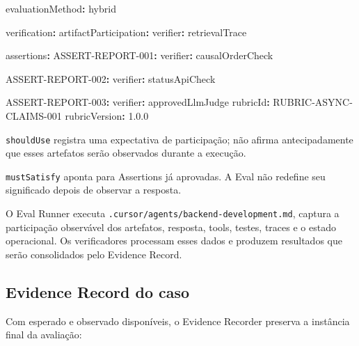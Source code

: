 \documentclass[
  10pt,
  a4paper,
  oneside]{book}
\newenvironment{Shaded}{}{}
\newcommand{\AttributeTok}[1]{\textcolor[rgb]{0.49,0.56,0.16}{#1}}
\newcommand{\FloatTok}[1]{\textcolor[rgb]{0.25,0.63,0.44}{#1}}
\newcommand{\FunctionTok}[1]{\textcolor[rgb]{0.02,0.16,0.49}{#1}}
\newcommand{\KeywordTok}[1]{\textcolor[rgb]{0.00,0.44,0.13}{\textbf{#1}}}
\renewenvironment{Shaded}{\begin{snugshade}}{\end{snugshade}}%
\begin{document}
\begin{Shaded}
\begin{Highlighting}[]
\FunctionTok{evaluationMethod}\KeywordTok{:}\AttributeTok{ hybrid}

\FunctionTok{verification}\KeywordTok{:}
\AttributeTok{  }\FunctionTok{artifactParticipation}\KeywordTok{:}
\AttributeTok{    }\FunctionTok{verifier}\KeywordTok{:}\AttributeTok{ retrievalTrace}

\AttributeTok{  }\FunctionTok{assertions}\KeywordTok{:}
\AttributeTok{    }\FunctionTok{ASSERT{-}REPORT{-}001}\KeywordTok{:}
\AttributeTok{      }\FunctionTok{verifier}\KeywordTok{:}\AttributeTok{ causalOrderCheck}

\AttributeTok{    }\FunctionTok{ASSERT{-}REPORT{-}002}\KeywordTok{:}
\AttributeTok{      }\FunctionTok{verifier}\KeywordTok{:}\AttributeTok{ statusApiCheck}

\AttributeTok{    }\FunctionTok{ASSERT{-}REPORT{-}003}\KeywordTok{:}
\AttributeTok{      }\FunctionTok{verifier}\KeywordTok{:}\AttributeTok{ approvedLlmJudge}
\AttributeTok{      }\FunctionTok{rubricId}\KeywordTok{:}\AttributeTok{ RUBRIC{-}ASYNC{-}CLAIMS{-}001}
\AttributeTok{      }\FunctionTok{rubricVersion}\KeywordTok{:}\AttributeTok{ }\FloatTok{1.0.0}
\end{Highlighting}
\end{Shaded}

\texttt{shouldUse} registra uma expectativa de participação; não afirma
antecipadamente que esses artefatos serão observados durante a execução.

\texttt{mustSatisfy} aponta para Assertions já aprovadas. A Eval não
redefine seu significado depois de observar a resposta.

O Eval Runner executa \texttt{.cursor/agents/backend-development.md},
captura a participação observável dos artefatos, resposta, tools,
testes, traces e o estado operacional. Os verificadores processam esses
dados e produzem resultados que serão consolidados pelo Evidence Record.

\hypertarget{evidence-record-do-caso}{%
\subsection{Evidence Record do caso}\label{evidence-record-do-caso}}

Com esperado e observado disponíveis, o Evidence Recorder preserva a
instância final da avaliação:
\end{document}
